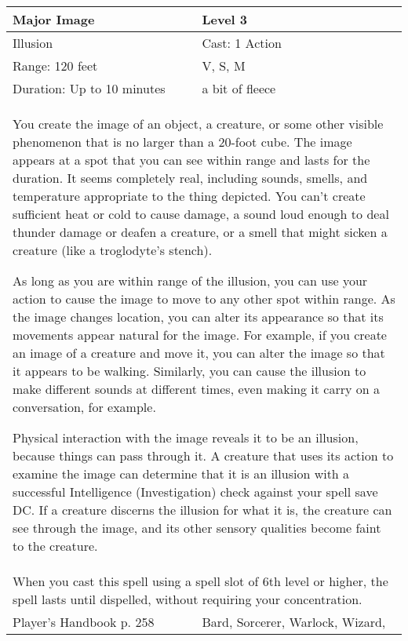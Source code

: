 \documentclass[11pt]{report}
\begin{document}
\begin{table}[H]
	\begin{tabular}{||p{6cm}|p{6cm}||}
		\hline\hline
		\bf{Major Image} & Level 3\\ \hline
		Illusion & Cast: 1 Action\\ \hline
		Range: 120 feet & V, S, M\\ \hline
		Duration: Up to 10 minutes & a bit of fleece\\ \hline
		\multicolumn{2}{||p{12cm}||}{You create the image of an object, a creature, or some other visible phenomenon that is no larger than a 20-foot cube.
The image appears at a spot that you can see within range and lasts for the duration. It seems completely real, including sounds, smells, and temperature appropriate to the thing depicted. You can’t create sufficient heat or cold to cause damage, a sound loud enough to deal thunder damage or deafen a creature, or a smell that might sicken a creature (like a troglodyte’s stench).

As long as you are within range of the illusion, you can use your action to cause the image to move to any other spot within range. As the image changes location, you can alter its appearance so that its movements appear natural for the image. For example, if you create an image of a creature and move it, you can alter the image so that it appears to be walking. Similarly, you can cause the illusion to make different sounds at different times, even making it carry on a conversation, for example.

Physical interaction with the image reveals it to be an illusion, because things can pass through it. A creature that uses its action to examine the image can determine that it is an illusion with a successful Intelligence (Investigation) check against your spell save DC. If a creature discerns the illusion for what it is, the creature can see through the image, and its other sensory qualities become faint to the creature.}\\ \hline
		\multicolumn{2}{||p{12cm}||}{When you cast this spell using a spell slot of 6th level or higher, the spell lasts until dispelled, without requiring your concentration.}\\ \hline
Player's Handbook p. 258 & Bard, Sorcerer, Warlock, Wizard, \\ \hline\hline
	\end{tabular}
\end{table}
\end{document}
